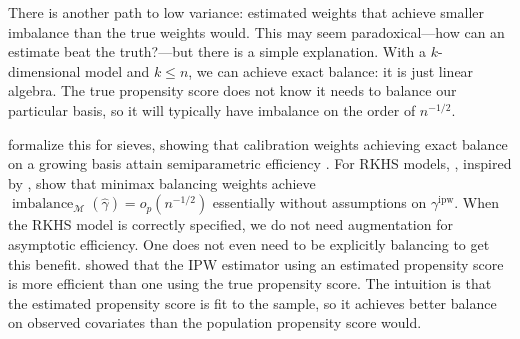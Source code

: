 \documentclass{article}
\theoremstyle{definition}
\newcommand{\ipw}{\text{ipw}}
\DeclareMathOperator{\imbalance}{imbalance}
\newcommand{\hgamma}{\ensuremath{\hat\gamma}}
\newcommand{\gammaipw}{\ensuremath{\gamma^{\ipw}}}
\newcommand{\model}{\mathcal{M}}
\newcommand{\<}{\langle}
\renewcommand{\>}{\rangle}
\begin{document}
There is another path to low variance: estimated weights that achieve smaller imbalance than the true weights would. This may seem paradoxical---how can an estimate beat the truth?---but there is a simple explanation. With a $k$-dimensional model and $k \le n$, we can achieve exact balance: it is just linear algebra. The true propensity score does not know it needs to balance our particular basis, so it will typically have imbalance on the order of $n^{-1/2}$.

\citet{chan2016globally} formalize this for sieves, showing that calibration weights achieving exact balance on a growing basis attain semiparametric efficiency \citep[see also][]{fan2016improving, wang2020minimal}. For RKHS models, \citet{hirshberg2019minimax}, inspired by \citet{newey2018cross}, show that minimax balancing weights achieve $\imbalance_{\model}(\hgamma) = o_p(n^{-1/2})$ essentially without assumptions on $\gammaipw$. When the RKHS model is correctly specified, we do not need augmentation for asymptotic efficiency. One does not even need to be explicitly balancing to get this benefit. \citet{hirano2003efficient} showed that the IPW estimator using an estimated propensity score is more efficient than one using the true propensity score. The intuition is that the estimated propensity score is fit to the sample, so it achieves better balance on observed covariates than the population propensity score would.
\end{document}
